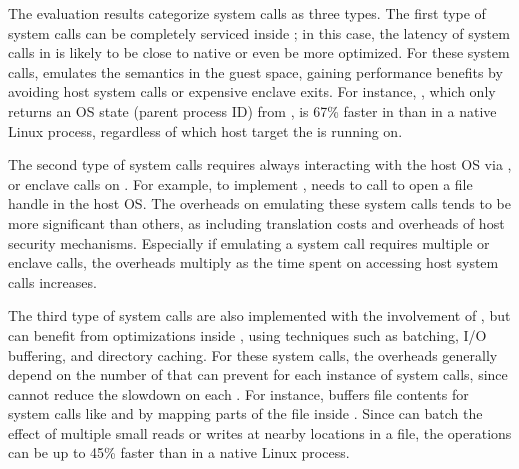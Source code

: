 

The evaluation results categorize
system calls as three types.
The first type of system calls can be completely serviced inside \thelibos{};
in this case, the latency of system calls
in \picoprocs{}
is likely to be close to native
or even be more optimized.
For these system calls,
\thelibos{} emulates the semantics
in the guest space,
gaining performance benefits
by avoiding host system calls or expensive enclave exits.
For instance,
, which only returns an OS state
(parent process ID) from \thelibos{},
is 67\% faster in \graphene{} than in a native Linux process,
regardless of which host target
the \libos{} is running on.


The second type of system calls
requires
always interacting with the host OS via \thehostabi{},
or enclave calls on \sgx{}.
For example, to implement , \thelibos{} needs to call  to open a file handle in the host OS.
The overheads on emulating these system calls
tends to be more significant
than others, as including translation costs and overheads of host security mechanisms.
Especially if emulating a system call
requires multiple \hostapis{}
or enclave calls,
the overheads multiply as the time spent on accessing host system calls increases.



The third type of system calls are also implemented
with the involvement
of \hostapis{}, but can benefit from optimizations inside \libos{}, using techniques
such as \hostapi{} batching, I/O buffering,
and directory caching. 
For these system calls,
the overheads generally depend on
the number of \hostapis{}
that \thelibos{} can prevent for each instance of system calls,
since \thelibos{}
cannot reduce the slowdown on each \hostapi{}.
For instance,
\thelibos{} buffers file contents for system calls like  and 
by mapping parts of the file inside \picoprocs{}.
Since \thelibos{}
can batch the effect of multiple small reads or writes
at nearby locations in a file,
the operations
can be up to \roughly{}45\% faster than in a native Linux process.  


